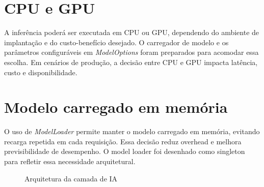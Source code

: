 \section{CPU e GPU}

A inferência poderá ser executada em CPU ou GPU, dependendo do ambiente de implantação e do custo-benefício desejado. O carregador de modelo e os parâmetros configuráveis em \textit{ModelOptions} foram preparados para acomodar essa escolha. Em cenários de produção, a decisão entre CPU e GPU impacta latência, custo e disponibilidade.

\section{Modelo carregado em memória}

O uso de \textit{ModelLoader} permite manter o modelo carregado em memória, evitando recarga repetida em cada requisição. Essa decisão reduz overhead e melhora previsibilidade de desempenho. O model loader foi desenhado como singleton para refletir essa necessidade arquitetural.

\begin{figure}[H]
    \centering
    \caption{Arquitetura da camada de IA}
    \label{fig:ia-arquitetura}
\end{figure}

